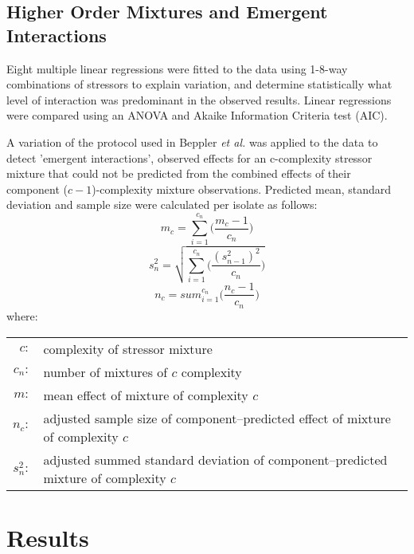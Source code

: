 \documentclass[review,12pt]{elsarticle}
\begin{document}
\subsection{Higher Order Mixtures and Emergent Interactions}
\label{S:2:10}
Eight multiple linear regressions were fitted to the data using 1-8-way combinations of stressors to explain variation, and determine statistically what level of interaction was predominant in the observed results. Linear regressions were compared using an ANOVA and Akaike Information Criteria test (AIC). 

A variation of the protocol used in Beppler \textit{et al.} \cite{Beppler2016UncoveringStressors} was applied to the data to detect 'emergent interactions', observed effects for an c-complexity stressor mixture that could not be predicted from the combined effects of their component ($c-1$)-complexity mixture observations. Predicted mean, standard deviation and sample size were calculated per isolate as follows: 
\begin{equation}
    m_c = \sum_{i = 1}^{c_n}\Big(\frac{m_c-1}{c_n}\Big)
\label{E:pred_mean}    
\end{equation}
\begin{equation}
    s^2_n = \sqrt{\sum_{i = 1}^{c_n}\bigg(\frac{(s^2_{n-1})^2}{c_n}\bigg)}
\label{E:pred_sd}    
\end{equation}
\begin{equation}
    n_c = sum_{i = 1}^{c_n}\Big(\frac{n_c-1}{c_n}\Big)
\label{E:pred_n}    
\end{equation}
where:

\begin{small}
\setlength{\tabcolsep}{1pt}
\begin{tabular}{r p{11cm}}
    $c :$ & complexity of stressor mixture \\
    $c_n :$ & number of mixtures of $c$ complexity \\
    $m :$ & mean effect of mixture of complexity $c$ \\
    $n_c :$ & adjusted sample size of component--predicted effect of mixture of complexity $c$ \\
    $s^2_n :$ & adjusted summed standard deviation of component--predicted mixture of complexity $c$ \\
\end{tabular}
\end{small}

\section{Results}
\label{S:3}
\end{document}
